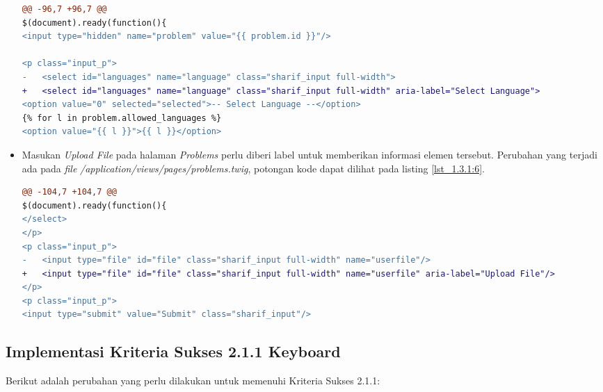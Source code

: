 \begin{itemize}
\begin{lstlisting}[language=diff, caption=Perubahan pada \textit{file} \textit{problems.twig} untuk \textit{Dropdown Select Language}, label=lst_1.3.1:5, basicstyle=\ttfamily, frame=single,
columns=fullflexible, keepspaces=true, breaklines=true]
@@ -96,7 +96,7 @@ 
$(document).ready(function(){
<input type="hidden" name="problem" value="{{ problem.id }}"/>

<p class="input_p">
- 	<select id="languages" name="language" class="sharif_input full-width">
+ 	<select id="languages" name="language" class="sharif_input full-width" aria-label="Select Language">
<option value="0" selected="selected">-- Select Language --</option>
{% for l in problem.allowed_languages %}
<option value="{{ l }}">{{ l }}</option>
\end{lstlisting}

	\item Masukan \textit{Upload File} pada halaman \textit{Problems} perlu diberi label untuk memberikan informasi elemen tersebut. Perubahan yang terjadi ada pada \textit{file} \textit{/application/views/pages/problems.twig}, potongan kode dapat dilihat pada listing \ref{lst_1.3.1:6}.
	
\begin{lstlisting}[language=diff, caption=Perubahan pada \textit{file} \textit{problems.twig} untuk masukan \textit{Upload \textit{file}}, label=lst_1.3.1:6, basicstyle=\ttfamily, frame=single,
columns=fullflexible, keepspaces=true, breaklines=true]
@@ -104,7 +104,7 @@ 
$(document).ready(function(){
</select>
</p>
<p class="input_p">
- 	<input type="file" id="file" class="sharif_input full-width" name="userfile"/>
+ 	<input type="file" id="file" class="sharif_input full-width" name="userfile" aria-label="Upload File"/>
</p>
<p class="input_p">
<input type="submit" value="Submit" class="sharif_input"/>
\end{lstlisting}
\end{itemize}

\subsection{Implementasi Kriteria Sukses 2.1.1 Keyboard}
\label{subsec:implementasi_A_2.1.1}
Berikut adalah perubahan yang perlu dilakukan untuk memenuhi Kriteria Sukses 2.1.1:


